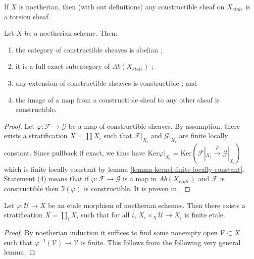 \begin{remark}
\label{remark-noetherian-constructible-torsion}
If $X$ is noetherian, then (with out definitions)
any constructible sheaf on $X_{etale}$ is a torsion sheaf.
\end{remark}

\begin{lemma}
\label{lemma-constructible-abelian}
Let $X$ be a noetherian scheme. Then:
\begin{enumerate}
\item the category of constructible sheaves is abelian ;
\item it is a full exact subcategory of $\textit{Ab}(X_{etale})$ ;
\item any extension of constructible sheaves is constructible ; and
\item the image of a map from a constructible sheaf to any other sheaf
is constructible.
\end{enumerate}
\end{lemma}

\begin{proof}
Let $\varphi: \mathcal{F} \to \mathcal{G}$ be a map of constructible sheaves.
By assumption, there exists a stratification $X = \coprod X_i$ such that
$\mathcal{F}|_{X_i}$ and $\mathcal{G}|_{X_i}$ are finite locally constant.
Since pullback if exact, we thus have $\text{Ker} \varphi|_{X_i} = \text{Ker}
(\mathcal{F}|_{X_i}\xrightarrow{\varphi} \mathcal{G}|_{X_i})$ which is finite
locally constant by lemma \ref{lemma-kernel-finite-locally-constant}.
Statement (4) means that if $\varphi :\mathcal{F}\to\mathcal{G}$ is a map in
$\textit{Ab}(X_{etale})$ and $\mathcal{F}$ is constructible then $\Im(\varphi)$ 
is
constructible. It is proven in \cite{SGA4.5}.
\end{proof}

\begin{lemma}
\label{lemma-etale-stratified-finite}
Let $\varphi: \mathcal{U} \to X$ be an etale morphism of noetherian schemes.
Then there exists a stratification $X=\coprod_i X_i$ such that for all $i$,
$X_i\times_X \mathcal{U} \to X_i$ is finite etale.
\end{lemma}

\begin{proof}
By noetherian induction it suffices to find some nonempty open
$\mathcal{V}\subset X$ such that $\varphi^{-1}(\mathcal{V})\to \mathcal{V}$
is finite. This follows from the following very general lemma.
\end{proof}


